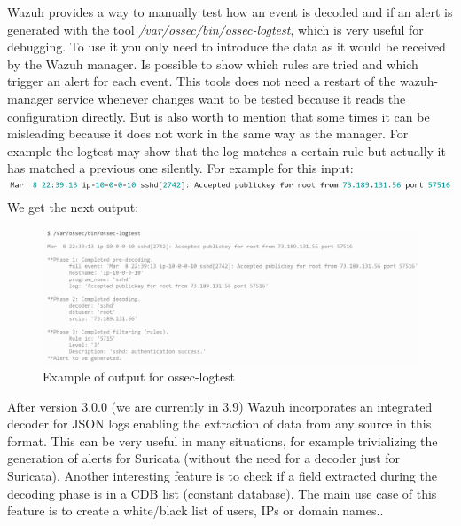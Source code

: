 \linej
Wazuh provides a way to manually test how an event is decoded and if an alert is generated with the tool \textit{/var/ossec/bin/ossec-logtest}\cite{wazuh_testing}, which is very useful for debugging.
To use it you only need to introduce the data as it would be received by the Wazuh manager.
Is possible to show which rules are tried and which trigger an alert for each event.
This tools does not need a restart of the wazuh-manager service whenever changes want to be tested because it reads the configuration directly.
\linej
But is also worth to mention that some times it can be misleading because it does not work in the same way as the manager.
For example the logtest may show that the log matches a certain rule but actually it has matched a previous one silently.
\linej
\linej
For example for this input:
\linej
\includegraphics[width=\textwidth]{figuras/ossec-logtest_input.png}
\linej
We get the next output:
\begin{figure}[H]
  \centering
	\includegraphics[width=\textwidth]{figuras/ossec-logtest_output.png}
	\caption{Example of output for ossec-logtest}
\end{figure}
\linej
After version 3.0.0 (we are currently in 3.9) Wazuh incorporates an integrated decoder for JSON logs enabling the extraction of data from any source in this format. This can be very useful in many situations, for example trivializing the generation of alerts for Suricata (without the need for a decoder just for Suricata)\cite{wazuh_json}.
\linej
\linej
Another interesting feature is to check if a field extracted during the decoding phase is in a CDB list (constant database). The main use case of this feature is to create a white/black list of users, IPs or domain names.\cite{wazuh_cdb}.
